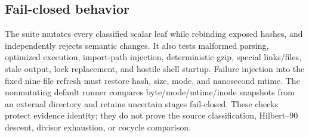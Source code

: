 \subsection{Fail-closed behavior}

The suite mutates every classified scalar leaf while rebinding exposed
hashes, and independently rejects semantic changes.  It also tests malformed
parsing, optimized execution, import-path injection, deterministic gzip,
special links/files, stale output, lock replacement, and hostile shell
startup.  Failure injection into the fixed nine-file refresh must restore
hash, size, mode, and nanosecond mtime.  The nonmutating default runner
compares byte/mode/mtime/inode snapshots from an external directory and
retains uncertain stages fail-closed.  These checks protect evidence
identity; they do not prove the source classification, Hilbert--90 descent,
divisor exhaustion, or cocycle comparison.
